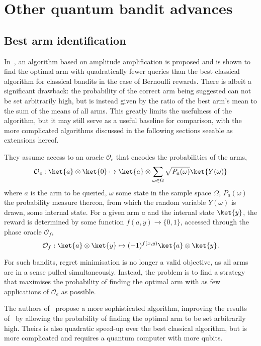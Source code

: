 \section{Other quantum bandit advances}

\subsection{Best arm identification}
In~\autocite{casale2020}, an algorithm based on amplitude amplification is proposed and is shown to find the optimal arm with quadratically fewer queries than the best classical algorithm for classical bandits in the case of Bernoulli rewards.
There is albeit a significant drawback: the probability of the correct arm being suggested can not be set arbitrarily high, but is instead given by the ratio of the best arm's mean to the sum of the means of all arms.
This greatly limits the usefulness of the algorithm, but it may still serve as a useful baseline for comparison, with the more complicated algorithms discussed in the following sections seeable as extensions hereof.

They assume access to an oracle $\mathcal{O}_e$ that encodes the probabilities of the arms,
\begin{equation}
    \mathcal{O}_e: \ket{a} \otimes \ket{0} \mapsto \ket{a} \otimes \sum_{\omega \in \Omega} \sqrt{P_a(\omega)} \ket{Y(\omega)}
\end{equation}
where $a$ is the arm to be queried, $\omega$ some state in the sample space $\Omega$, $P_a(\omega)$ the probability measure thereon, from which the random variable $Y(\omega)$ is drawn, some internal state.
For a given arm $a$ and the internal state $\ket{y}$, the reward is determined by some function $f(a, y) \to \{0, 1\}$, accessed through the phase oracle $\mathcal{O}_f$,
\begin{equation}
    \mathcal{O}_f :  \ket{a}\otimes\ket{y} \mapsto (-1)^{f(x,y)} \ket{a}\otimes\ket{y}.
\end{equation}

For such bandits, regret minimisation is no longer a valid objective, as all arms are in a sense pulled simultaneously.
Instead, the problem is to find a strategy that maximises the probability of finding the optimal arm with as few applications of $\mathcal{O}_e$ as possible.

The authors of~\autocite{wang2021} propose a more sophisticated algorithm, improving the results of~\autocite{casale2020} by allowing the probability of finding the optimal arm to be set arbitrarily high.
Theirs is also quadratic speed-up over the best classical algorithm, but is more complicated and requires a quantum computer with more qubits.